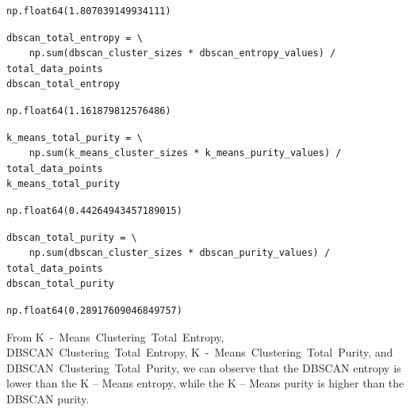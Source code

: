 \begin{verbatim}
np.float64(1.807039149934111)
\end{verbatim}

\begin{verbatim}
dbscan_total_entropy = \
    np.sum(dbscan_cluster_sizes * dbscan_entropy_values) / total_data_points
dbscan_total_entropy
\end{verbatim}

\begin{verbatim}
np.float64(1.161879812576486)
\end{verbatim}

\begin{verbatim}
k_means_total_purity = \
    np.sum(k_means_cluster_sizes * k_means_purity_values) / total_data_points
k_means_total_purity
\end{verbatim}

\begin{verbatim}
np.float64(0.44264943457189015)
\end{verbatim}

\begin{verbatim}
dbscan_total_purity = \
    np.sum(dbscan_cluster_sizes * dbscan_purity_values) / total_data_points
dbscan_total_purity
\end{verbatim}

\begin{verbatim}
np.float64(0.28917609046849757)
\end{verbatim}

From K~-~Means~Clustering~Total~Entropy, DBSCAN~Clustering~Total~Entropy, K~-~Means~Clustering~Total~Purity, and DBSCAN~Clustering~Total~Purity, we can observe that the DBSCAN entropy is lower than the K -- Means entropy, while the K -- Means purity is higher than the DBSCAN purity.

